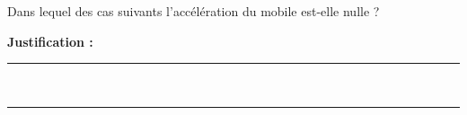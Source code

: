 Dans lequel des cas suivants l'accélération du mobile est-elle nulle ?

\choices

\noindent\textbf{Justification :} \hrulefill \\[2.5ex]
\rule{\linewidth}{0.4pt} \\[2.5ex]
\rule{\linewidth}{0.4pt}
\vfill
